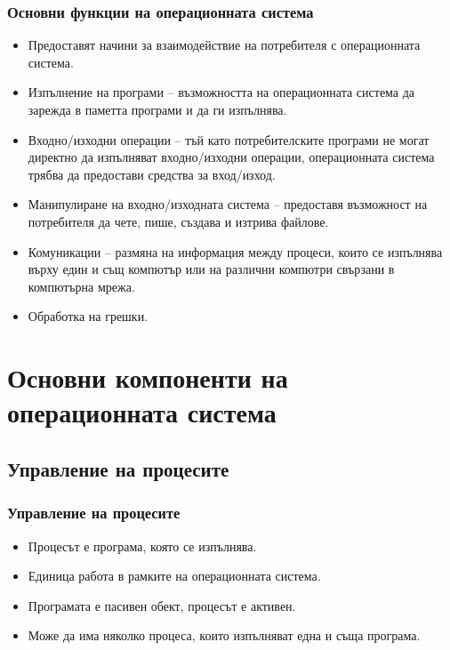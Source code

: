 \documentclass[ignorenonframetext, hyperref=unicode]{beamer}
\begin{document}
\begin{frame}
\frametitle{Основни функции на операционната система}
\begin{itemize}
\item Предоставят начини за взаимодействие на потребителя с операционната
система.
\item Изпълнение на програми -- възможността на операционната система да зарежда
в паметта програми и да ги изпълнява.
\item Входно/изходни операции -- тъй като потребителските програми не могат
директно да изпълняват входно/изходни операции, операционната система трябва да
предостави средства за вход/изход.
\item Манипулиране на входно/изходната система -- предоставя възможност на
потребителя да чете, пише, създава и изтрива файлове.
\item Комуникации -- размяна на информация между процеси, които се изпълнява
върху един и същ компютър или на различни компютри свързани в компютърна мрежа.
\item Обработка на грешки.

\end{itemize}
\end{frame}

\section{Основни компоненти на операционната система}

\subsection{Управление на процесите}
\begin{frame}
\frametitle{Управление на процесите}
\begin{itemize}
\item Процесът е програма, която се изпълнява.
\item Единица работа в рамките на операционната система.
\item Програмата е пасивен обект, процесът е активен.
\item Може да има няколко процеса, които изпълняват една и съща програма.
\end{itemize}
\end{frame}
\end{document}
